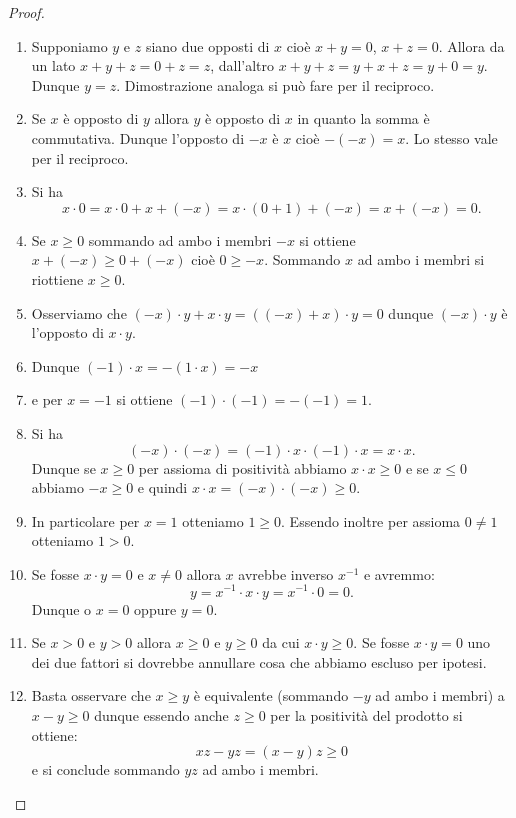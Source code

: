 \begin{proof}
\begin{enumerate}
\item
Supponiamo $y$ e $z$ siano due opposti di $x$ cioè $x+y=0$, $x+z=0$.
Allora da un lato $x+y+z = 0+z = z$, dall'altro $x+y+z = y+x+z= y+ 0 = y$.
Dunque $y=z$. Dimostrazione analoga si può fare per il reciproco.

\item
Se $x$ è opposto di $y$ allora $y$ è opposto di $x$ in quanto la somma
è commutativa. Dunque l'opposto di $-x$ è $x$ cioè $-(-x)=x$. Lo stesso
vale per il reciproco.

\item
Si ha
\[
x\cdot 0 = x \cdot 0 + x + (-x) %
=x\cdot(0+1) + (-x) = x + (-x) = 0.
\]

\item
Se $x\ge 0$ sommando ad ambo i membri $-x$ si ottiene $x+(-x) \ge 0 + (-x)$
cioè $0 \ge -x$. Sommando $x$ ad ambo i membri si riottiene $x\ge 0$.


\item
Osserviamo che $(-x)\cdot y + x\cdot y = ((-x)+x)\cdot y = 0$ dunque $(-x)\cdot y$ è l'opposto di $x\cdot y$.

\item
Dunque $(-1)\cdot x = - (1 \cdot x) = - x$

\item
e per $x=-1$ si ottiene $(-1)\cdot(-1) = -(-1) = 1$.

\item
Si ha
\[
(-x)\cdot(-x) = (-1)\cdot x \cdot (-1)\cdot x = x\cdot x.
\]
Dunque se $x\ge 0$ per assioma di positività
abbiamo $x\cdot x\ge 0$ e se $x\le 0$ abbiamo $-x\ge 0$ e quindi
$x\cdot x = (-x)\cdot(-x) \ge 0$.

\item
In particolare per $x=1$ otteniamo $1\ge 0$.
Essendo inoltre per assioma $0\neq 1$ otteniamo $1> 0$.

\item
Se fosse $x\cdot y = 0$ e $x\neq 0$ allora $x$ avrebbe inverso $x^{-1}$
e avremmo:
\[
  y = x^{-1} \cdot x \cdot y = x^{-1}\cdot 0 = 0.
\]
Dunque o $x=0$ oppure $y=0$.

\item
Se $x>0$ e $y>0$ allora $x\ge 0$ e $y\ge 0$ da cui $x\cdot y\ge 0$.
Se fosse $x\cdot y=0$ uno dei due fattori si dovrebbe annullare
cosa che abbiamo escluso per ipotesi.

\item
Basta osservare che $x\ge y$ è equivalente
(sommando $-y$ ad ambo i membri) a $x-y\ge 0$
dunque essendo anche $z\ge 0$ per la positività
del prodotto si ottiene:
\[
xz - yz = (x-y)z \ge 0
\]
e si conclude sommando $yz$ ad ambo i membri.
\end{enumerate}
\end{proof}

